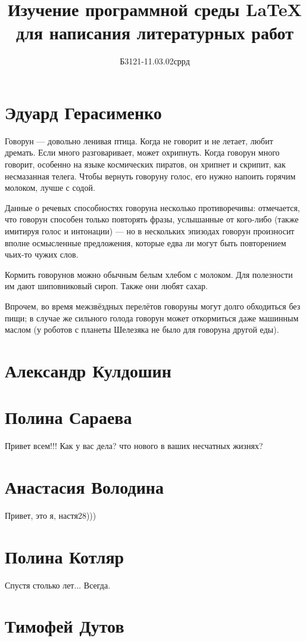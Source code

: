 \documentclass[labwork]{fefudoc}
\author{Б3121-11.03.02сррд}{Эдуард Герасименко}
\title{Изучение программной среды \LaTeX{} для написания литературных работ}
\begin{document}
\frontpage
\tableofcontents

\section{Эдуард Герасименко}
Говорун — довольно ленивая птица. Когда не говорит и не летает, любит дремать. Если много разговаривает, может охрипнуть. Когда говорун много говорит, особенно на языке космических пиратов, он хрипнет и скрипит, как несмазанная телега. Чтобы вернуть говоруну голос, его нужно напоить горячим молоком, лучше с содой.

Данные о речевых способностях говоруна несколько противоречивы: отмечается, что говорун способен только повторять фразы, услышанные от кого-либо (также имитируя голос и интонации) — но в нескольких эпизодах говорун произносит вполне осмысленные предложения, которые едва ли могут быть повторением чьих-то чужих слов.

Кормить говорунов можно обычным белым хлебом с молоком. Для полезности им дают шиповниковый сироп. Также они любят сахар.

Впрочем, во время межзвёздных перелётов говоруны могут долго обходиться без пищи; в случае же сильного голода говорун может откормиться даже машинным маслом (у роботов с планеты Шелезяка не было для говоруна другой еды).


\section{Александр Кулдошин}
\section{Полина Сараева}

Привет всем!!! Как у вас дела? что нового в ваших несчатных жизнях?

\section{Анастасия Володина}
Привет, это я, настя28))) 
\section{Полина Котляр}

Спустя столько лет...
Всегда.

\section{Тимофей Дутов}
\end{document}
